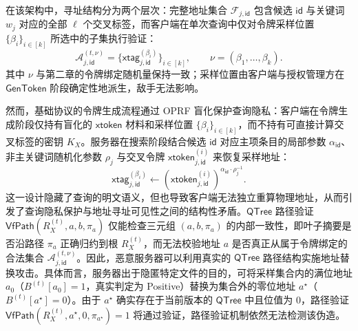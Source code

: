 在该架构中，寻址结构分为两个层次：完整地址集合 $\mathcal{F}_{j,\mathsf{id}}$ 包含候选 $\mathsf{id}$ 与关键词 $w_j$ 对应的全部 $\ell$ 个交叉标签，而客户端在单次查询中仅对令牌采样位置 $\{\beta_i\}_{i\in[k]}$ 所选中的子集执行验证：
\begin{equation}\label{eq:commit-sampled-set}
\mathcal{A}_{j,\mathsf{id}}^{(t,\nu)}=\{\mathsf{xtag}_{j,\mathsf{id}}^{(\beta_i)}\}_{i\in[k]},\qquad \nu=(\beta_1,\ldots,\beta_k).
\end{equation}
其中 $\nu$ 与第二章的令牌绑定随机量保持一致；采样位置由客户端与授权管理方在 $\mathsf{GenToken}$ 阶段确定性地派生，敌手无法影响。

然而，基础协议的令牌生成流程通过 OPRF 盲化保护查询隐私：客户端在令牌生成阶段仅持有盲化的 $\mathsf{xtoken}$ 材料和采样位置 $\{\beta_i\}_{i\in[k]}$，而不持有可直接计算交叉标签的密钥 $K_X$。服务器在搜索阶段结合候选 $\mathsf{id}$ 对应主项条目的局部参数 $\alpha_{\mathsf{id}}$、非主关键词随机化参数 $\rho_j$ 与交叉令牌 $\mathsf{xtoken}_{j,\mathsf{id}}^{(i)}$ 来恢复采样地址：
\begin{equation}\label{eq:commit-xtag-sampled}
\mathsf{xtag}_{j,\mathsf{id}}^{(\beta_i)}\leftarrow (\mathsf{xtoken}_{j,\mathsf{id}}^{(i)})^{\alpha_{\mathsf{id}}\cdot\rho_j^{-1}}.
\end{equation}
这一设计隐藏了查询的明文语义，但也导致客户端无法独立重算物理地址，从而引发了查询隐私保护与地址寻址可见性之间的结构性矛盾。$\mathsf{QTree}$ 路径验证 $\mathsf{VfPath}(R_X^{(t)},a,b,\pi_a)$ 仅能检查三元组 $(a,b,\pi_a)$ 的内部一致性，即叶子摘要是否沿路径 $\pi_a$ 正确归约到根 $R_X^{(t)}$，而无法校验地址 $a$ 是否真正从属于令牌绑定的合法集合 $\mathcal{A}_{j,\mathsf{id}}^{(t,\nu)}$。因此，恶意服务器可以利用真实的 $\mathsf{QTree}$ 路径结构实施地址替换攻击。具体而言，服务器出于隐匿特定文件的目的，可将采样集合内的满位地址 $a_0$（$B^{(t)}[a_0]=1$，真实判定为 Positive）替换为集合外的零位地址 $a^\star$（$B^{(t)}[a^\star]=0$）。由于 $a^\star$ 确实存在于当前版本的 $\mathsf{QTree}$ 中且位值为 $0$，路径验证 $\mathsf{VfPath}(R_X^{(t)},a^\star,0,\pi_{a^\star})=1$ 将通过验证，路径验证机制依然无法检测该伪造。 

